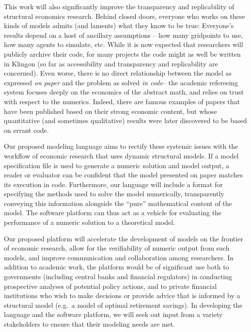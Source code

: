 \documentclass[11pt,pdftex,letterpaper]{article}
\begin{document}
This work will also significantly improve the transparency and replicability of structural economics research. Behind closed doors, everyone who works on these kinds of models admits (and laments) what they know to be true: Everyone's results depend on a host of ancillary assumptions -- how many gridpoints to use, how many agents to simulate, etc.  While it is now expected that researchers will publicly archive their code, for many projects the code might as well be written in Klingon (so far as accessibility and transparency and replicability are concerned).  Even worse, there is no direct relationship between the model as expressed \textit{on paper} and the problem as solved \textit{in code}-- the academic refereeing system focuses deeply on the economics of the abstract math, and relies on trust with respect to the numerics. Indeed, there are famous examples of papers that have been published based on their strong economic content, but whose quantitative (and sometimes qualitative) results were later discovered to be based on errant code.






Our proposed modeling language aims to rectify these systemic issues with the workflow of economic research that uses dynamic structural models. If a model specification file is used to generate a numeric solution and model output, a reader or evaluator can be confident that the model presented on paper matches its execution in code. Furthermore, our language will include a format for specifying the methods used to solve the model numerically, transparently conveying this information alongside the ``pure'' mathematical content of the model. The software platform can thus act as a vehicle for evaluating the performance of a numeric solution to a theoretical model.

Our proposed platform will accelerate the development of models on the frontier of economic research, allow for the verifiability of numeric output from such models, and improve communication and collaboration among researchers. In addition to academic work, the platform would be of significant use both to governments (including central banks and financial regulators) in conducting prospective analyses of potential policy actions, and to private financial institutions who wish to make decisions or provide advice that is informed by a structural model (e.g.\ a model of optimal retirement savings). In developing the language and the software platform, we will seek out input from a variety stakeholders to ensure that their modeling needs are met.
\end{document}
